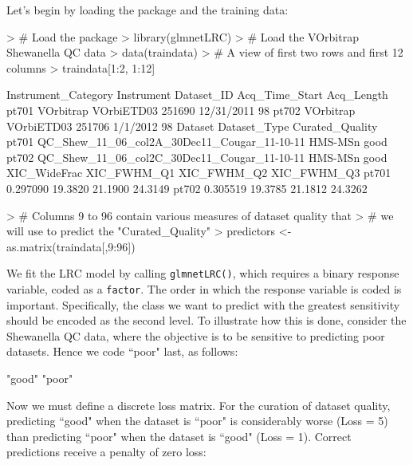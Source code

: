 \documentclass{article}
\begin{document}
Let's begin by loading the package and the training data:
\begin{Schunk}
\begin{Sinput}
> # Load the package
> library(glmnetLRC)
> # Load the VOrbitrap Shewanella QC data
> data(traindata)
> # A view of first two rows and first 12 columns
> traindata[1:2, 1:12]
\end{Sinput}
\begin{Soutput}
      Instrument_Category Instrument Dataset_ID Acq_Time_Start Acq_Length
pt701           VOrbitrap VOrbiETD03     251690     12/31/2011         98
pt702           VOrbitrap VOrbiETD03     251706       1/1/2012         98
                                          Dataset Dataset_Type Curated_Quality
pt701 QC_Shew_11_06_col2A_30Dec11_Cougar_11-10-11      HMS-MSn            good
pt702 QC_Shew_11_06_col2C_30Dec11_Cougar_11-10-11      HMS-MSn            good
      XIC_WideFrac XIC_FWHM_Q1 XIC_FWHM_Q2 XIC_FWHM_Q3
pt701     0.297090     19.3820     21.1900     24.3149
pt702     0.305519     19.3785     21.1812     24.3262
\end{Soutput}
\begin{Sinput}
> # Columns 9 to 96 contain various measures of dataset quality that
> # we will use to predict the "Curated_Quality"
> predictors <- as.matrix(traindata[,9:96])
\end{Sinput}
\end{Schunk}

\noindent We fit the LRC model by calling {\tt glmnetLRC()}, which 
requires a binary response variable, coded
as a {\tt factor}.  The order in which the response variable
is coded is important.  Specifically, the class we want to predict with
the greatest sensitivity should be encoded as the second level. To illustrate how this
is done, consider the Shewanella QC data, where the objective is to be
sensitive to predicting poor datasets.  Hence we code ``poor" last, as follows:
\begin{Schunk}
\begin{Soutput}
[1] "good" "poor"
\end{Soutput}
\end{Schunk}
\noindent Now we must define a discrete loss matrix. For the curation
of dataset quality, predicting ``good" when the dataset is ``poor" is considerably 
worse (Loss = 5) than predicting ``poor" when the dataset
is ``good" (Loss = 1).  Correct predictions receive a penalty of zero loss:
\end{document}
